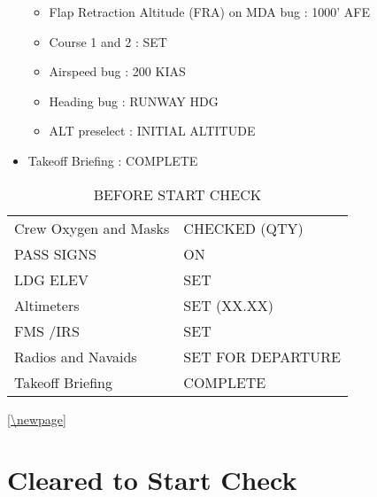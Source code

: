 \begin{itemize}
\begin{itemize}
\item Flap Retraction Altitude (FRA) on MDA bug : 1000' AFE

\item Course 1 and 2 : SET

\item Airspeed bug : 200 KIAS

\item Heading bug : RUNWAY HDG

\item ALT preselect : INITIAL ALTITUDE

\end{itemize}

\item Takeoff Briefing : COMPLETE

\end{itemize}

\begin{table}[htbp]
\begin{minipage}{\linewidth}
\setlength{\tymax}{0.5\linewidth}
\centering
\small
\caption{BEFORE START CHECK}
\label{beforestartcheck}
\begin{tabulary}{\textwidth}{@{}ll@{}} \toprule
\midrule

 Crew Oxygen and Masks & CHECKED (QTY)  \\
 PASS SIGNS   & ON    \\
 LDG ELEV    & SET    \\
 Altimeters   & SET (XX.XX)  \\
 FMS \slash  IRS    & SET    \\
 Radios and Navaids & SET FOR DEPARTURE \\
 Takeoff Briefing  & COMPLETE   \\
\bottomrule

\end{tabulary}
\end{minipage}
\end{table}

\autoref{\newpage}

\section{Cleared to Start Check}
\label{clearedtostartcheck}

